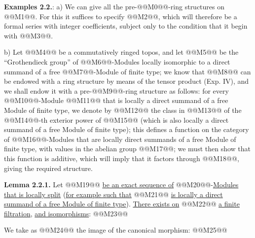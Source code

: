 \textbf{Examples 2.2.}: a) We can give all the pre-@@M0@@-ring structures on @@M1@@. For this it suffices to specify @@M2@@, which will therefore be a formal series with integer coefficients, subject only to the condition that it begin with @@M3@@.

b) Let @@M4@@ be a commutatively ringed topos, and let @@M5@@ be the ``Grothendieck group'' of @@M6@@-Modules locally isomorphic to a direct summand of a free @@M7@@-Module of finite type; we know that @@M8@@ can be endowed with a ring structure by means of the tensor product (Exp. IV), and we shall endow it with a pre-@@M9@@-ring structure as follows: for every @@M10@@-Module @@M11@@ that is locally a direct summand of a free Module of finite type, we denote by @@M12@@ the class in @@M13@@ of the @@M14@@-th exterior power of @@M15@@ (which is also locally a direct summand of a free Module of finite type); this defines a function on the category of @@M16@@-Modules that are locally direct summands of a free Module of finite type, with values in the abelian group @@M17@@; we must then show that this function is additive, which will imply that it factors through @@M18@@, giving the required structure.

\textbf{Lemma 2.2.1.} Let @@M19@@ \uline{be an exact sequence of} @@M20@@-\uline{Modules that is locally split} (\uline{for example such that} @@M21@@ \uline{is locally a direct summand of a free Module of finite type}). \uline{There exists on} @@M22@@ \uline{a finite filtration}, \uline{and isomorphisms}:
@@M23@@

We take as @@M24@@ the image of the canonical morphism:
@@M25@@
